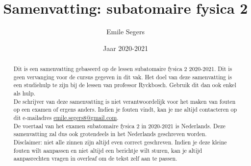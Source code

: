 \documentclass{article}
\title{Samenvatting: subatomaire fysica 2}
\author{Emile Segers}
\date{Jaar 2020-2021}
\begin{document}
\maketitle

\begin{abstract}
    Dit is een samenvatting gebaseerd op de lessen subatomaire fysica 2 2020-2021. Dit is geen vervanging voor de cursus gegeven in dit vak. Het doel van deze samenvatting is een studiehulp te zijn bij de lessen van professor Ryckbosch. Gebruik dit dan ook enkel als hulp.\\
    De schrijver van deze samenvatting is niet verantwoordelijk voor het maken van fouten op een examen of ergens anders. Indien je fouten vindt, kan je me altijd contacteren op dit e-mailadres \href{mailto:emile.segers8@gmail.com}{emile.segers8@gmail.com}.\\
    De voertaal van het examen subatomaire fysica 2 in 2020-2021 is Nederlands. Deze samenvatting zal dus ook grotendeels in het Nederlands geschreven worden.\\
    {\color{red} Disclaimer:} niet alle zinnen zijn altijd even correct geschreven. Indien je deze kleine fouten wilt aanpassen en niet altijd een berichtje wilt sturen, kan je altijd aanpasrechten vragen in overleaf om de tekst zelf aan te passen.

\end{abstract}

\tableofcontents
























\end{document}
